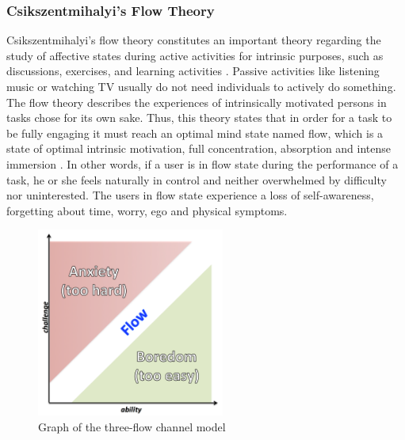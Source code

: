 \subsubsection{Csikszentmihalyi's Flow Theory}
\label{subsubsec:flow-theory}

Csikszentmihalyi's flow theory constitutes an important theory regarding the study of affective states during active activities for intrinsic purposes, such as discussions, exercises, and learning activities \cite{SnyderLopezPedrotti2010, Csikszentmihalyi2014}.
Passive activities like listening music or watching TV usually do not need individuals to actively do something.
The flow theory describes the experiences of intrinsically motivated persons in tasks chose for its own sake.
Thus, this theory states that in order for a task to be fully engaging it must reach an optimal mind state named flow, which is a state of optimal intrinsic motivation, full concentration, absorption and intense immersion \cite{Wu2011, Xu2011}.
In other words, if a user is in flow state during the performance of a task, he or she feels naturally in control and neither overwhelmed by difficulty nor uninterested.
The users in flow state experience a loss of self-awareness, forgetting about time, worry, ego and physical symptoms.

\begin{figure}[htb]
 \caption{Graph of the three-flow channel model}
 \label{fig:flow-channel}
 \centering
 \includegraphics[width=0.55\textwidth]{images/chap-general-background/flow-channel.png}
\end{figure}

